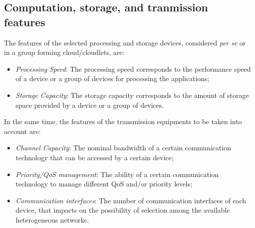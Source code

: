 \documentclass[twoside,openright]{report}
\begin{document}
\subsection*{Computation, storage, and tranmission features}  
The features of the selected processing and storage devices, considered \textit{per se} or in a group forming cloud/cloudlets, are: 
\begin{itemize}
\item \emph{Processing Speed}: The processing speed corresponds to the performance speed of a device or a group of devices for processing the applications;
\item \emph{Storage Capacity}: The storage capacity corresponds to the amount of storage space provided by a device or a group of devices.
\end{itemize}
In the same time, the features of the transmission equipments to be taken into account are:
\begin{itemize}
\item \emph{Channel Capacity}: The nominal bandwidth of a certain communication technology that can be accessed by a certain device;
\item \emph{Priority/QoS management}: The ability of a certain communication technology to manage different \gls{QoS} and/or priority levels;
\item \emph{Communication interfaces}: The number of communication interfaces of each device, that impacts on the possibility of selection among the available heterogeneous networks.
\end{itemize}
\end{document}
